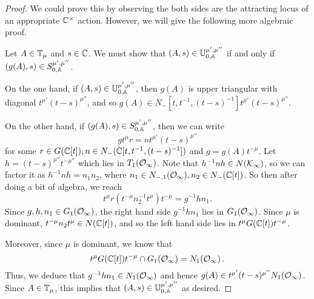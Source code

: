 \documentclass[draft]{article}
\begin{document}
% 
% 
% 

\begin{proof}
We could prove this by observing the both sides are the attracting locus of an appropriate $ \CC^\times$ action. However, we will give the following more algebraic proof.

Let $ A \in \TT_\mu$ and $ s \in \CC $. We must show that  $ (A,s) \in \UU^{\mu', \mu''}_{0,\AA} $ if and only if $ (g(A),s) \in S^{\mu', \mu''}_{0,\AA} $.

On the one hand, if $ (A,s) \in \UU^{\mu', \mu''}_{0,\AA} $, then $ g(A)$ is upper triangular with diagonal $ t^{\mu'} (t-s)^{\mu''}$, and so $ g(A) \in N_-[t, t^{-1}, (t-s)^{-1}] t^{\mu'} (t-s)^{\mu''}$. 


On the other hand, if $ (g(A), s) \in S^{\mu', \mu''}_{0,\AA}$, then we can write 
$$
g t^\mu r= n t^{\mu'} (t-s)^{\mu''}
$$
for some $ r \in G(\CC[t]), n \in N_-(\CC[t, t^{-1}, (t-s)^{-1}]) $ and $ g = g(A)t^{-\mu}$.  Let $ h = (t-s)^{\mu''} t^{-\mu''}$ which lies in $ T_1(\Oinf) $. %
Note that $ h^{-1}n h \in N(\Kinf)$, 
so we can factor it as $ h^{-1} n h  = n_1 n_2 $, where $ n_1 \in N_{-,1}(\Oinf), n_2 \in N_-(\CC[t])$.  So then after doing a bit of algebra, we reach
$$
t^\mu r (t^{-\mu} n_2^{-1} t^\mu) t^{-\mu} = g^{-1} h n_1.
$$
Since $ g, h, n_1 \in G_1(\Oinf)$, the right hand side $ g^{-1} h n_1 $ lies in $ G_1(\Oinf) $.  Since $ \mu $ is dominant, $ t^{-\mu} n_2 t^\mu \in N(\CC[t])$, and so the left hand side lies in $t^\mu G(\CC[t]) t^{-\mu}$.

Moreover, since $ \mu $ is dominant, we know that 
$$t^\mu G(\CC[t]) t^{-\mu} \cap G_1(\Oinf) = N_1(\Oinf)\,.$$
Thus, we deduce that $ g^{-1} h n_1 \in N_1(\Oinf)$ 
and hence $ g(A) \in t^{\mu'} (t-s)^{\mu''} N_1(\Oinf) $.  
Since $ A \in \TT_\mu $, this implies that $ (A,s) \in \UU^{\mu', \mu''}_{0,\AA}$ as desired.
\end{proof}
\end{document}
